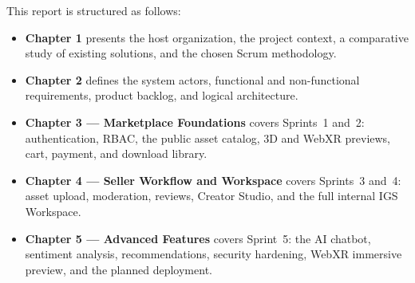 This report is structured as follows:
\begin{itemize}
	\item \textbf{Chapter 1} presents the host organization, the project context, a comparative study of existing solutions, and the chosen Scrum methodology.
	\item \textbf{Chapter 2} defines the system actors, functional and non-functional requirements, product backlog, and logical architecture.
	\item \textbf{Chapter 3 --- Marketplace Foundations} covers Sprints~1 and~2: authentication, RBAC, the public asset catalog, 3D and WebXR previews, cart, payment, and download library.
	\item \textbf{Chapter 4 --- Seller Workflow and Workspace} covers Sprints~3 and~4: asset upload, moderation, reviews, Creator Studio, and the full internal IGS Workspace.
	\item \textbf{Chapter 5 --- Advanced Features} covers Sprint~5: the AI chatbot, sentiment analysis, recommendations, security hardening, WebXR immersive preview, and the planned deployment.
\end{itemize}
